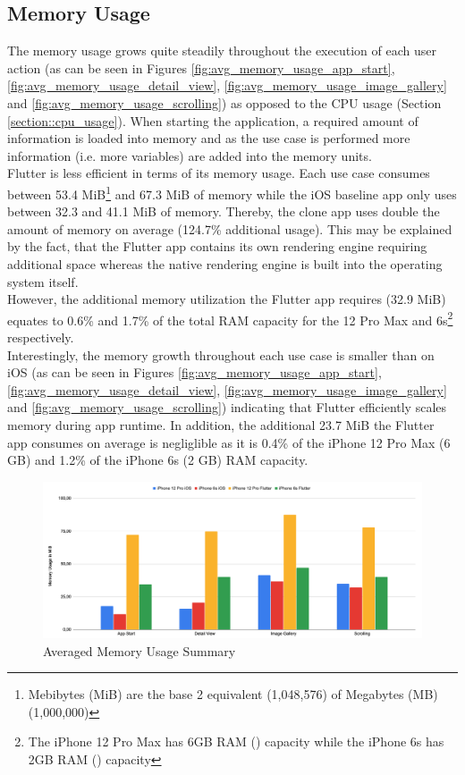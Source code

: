 \subsection{Memory Usage}
The memory usage grows quite steadily throughout the execution of each user action (as can be seen in Figures \ref{fig:avg_memory_usage_app_start}, \ref{fig:avg_memory_usage_detail_view}, \ref{fig:avg_memory_usage_image_gallery} and \ref{fig:avg_memory_usage_scrolling}) as opposed to the CPU usage (Section \ref{section::cpu_usage}).
When starting the application, a required amount of information is loaded into memory and 
as the use case is performed more information (i.e. more variables) are added into the memory units.\\
Flutter is less efficient in terms of its memory usage. Each use case consumes between 53.4 MiB\footnote{Mebibytes (MiB) are the base 2 equivalent (1,048,576) of Megabytes (MB) (1,000,000)} and 67.3 MiB of memory while the iOS baseline app only uses between 32.3 and 41.1 MiB of memory.
Thereby, the clone app uses double the amount of memory on average (124.7\% additional usage).
This may be explained by the fact, that the Flutter app contains its own rendering engine requiring additional space whereas the native rendering engine is built into the operating system itself.\\
However, the additional memory utilization the Flutter app requires (32.9 MiB) equates to 0.6\% and 1.7\% of the total RAM capacity for the 12 Pro Max and 6s\footnote{The iPhone 12 Pro Max has 6GB RAM (\cite{GSMArena12ProMax2020}) capacity while the iPhone 6s has 2GB RAM (\cite{GSMArena2015}) capacity} respectively.\\
Interestingly, the memory growth throughout each use case is smaller than on iOS (as can be seen in Figures \ref{fig:avg_memory_usage_app_start}, \ref{fig:avg_memory_usage_detail_view}, \ref{fig:avg_memory_usage_image_gallery} and \ref{fig:avg_memory_usage_scrolling}) indicating that Flutter efficiently scales memory during app runtime.
In addition, the additional 23.7 MiB the Flutter app consumes on average is negliglible as it is 0.4\% of the iPhone 12 Pro Max (6 GB) and 1.2\% of the 
iPhone 6s (2 GB) RAM capacity.

\begin{figure}[!h]
    \centering
    \includegraphics[width=\linewidth]{images/performance_results/summary_charts/avg_memory_usage_summary.png}
    \caption{Averaged Memory Usage Summary}
    \label{fig:avg_memory_usage_summary}
\end{figure}

